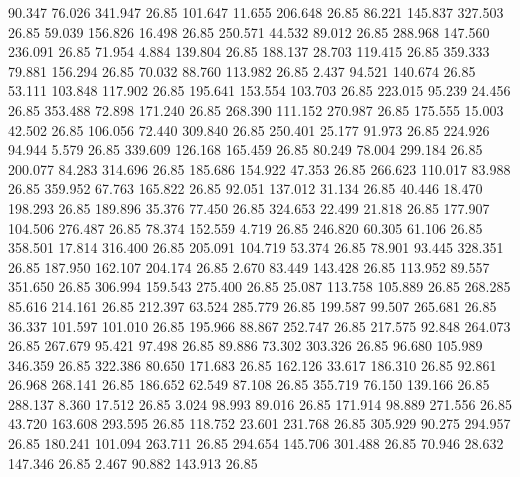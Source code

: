   90.347   76.026  341.947        26.85
 101.647   11.655  206.648        26.85
  86.221  145.837  327.503        26.85
  59.039  156.826   16.498        26.85
 250.571   44.532   89.012        26.85
 288.968  147.560  236.091        26.85
  71.954    4.884  139.804        26.85
 188.137   28.703  119.415        26.85
 359.333   79.881  156.294        26.85
  70.032   88.760  113.982        26.85
   2.437   94.521  140.674        26.85
  53.111  103.848  117.902        26.85
 195.641  153.554  103.703        26.85
 223.015   95.239   24.456        26.85
 353.488   72.898  171.240        26.85
 268.390  111.152  270.987        26.85
 175.555   15.003   42.502        26.85
 106.056   72.440  309.840        26.85
 250.401   25.177   91.973        26.85
 224.926   94.944    5.579        26.85
 339.609  126.168  165.459        26.85
  80.249   78.004  299.184        26.85
 200.077   84.283  314.696        26.85
 185.686  154.922   47.353        26.85
 266.623  110.017   83.988        26.85
 359.952   67.763  165.822        26.85
  92.051  137.012   31.134        26.85
  40.446   18.470  198.293        26.85
 189.896   35.376   77.450        26.85
 324.653   22.499   21.818        26.85
 177.907  104.506  276.487        26.85
  78.374  152.559    4.719        26.85
 246.820   60.305   61.106        26.85
 358.501   17.814  316.400        26.85
 205.091  104.719   53.374        26.85
  78.901   93.445  328.351        26.85
 187.950  162.107  204.174        26.85
   2.670   83.449  143.428        26.85
 113.952   89.557  351.650        26.85
 306.994  159.543  275.400        26.85
  25.087  113.758  105.889        26.85
 268.285   85.616  214.161        26.85
 212.397   63.524  285.779        26.85
 199.587   99.507  265.681        26.85
  36.337  101.597  101.010        26.85
 195.966   88.867  252.747        26.85
 217.575   92.848  264.073        26.85
 267.679   95.421   97.498        26.85
  89.886   73.302  303.326        26.85
  96.680  105.989  346.359        26.85
 322.386   80.650  171.683        26.85
 162.126   33.617  186.310        26.85
  92.861   26.968  268.141        26.85
 186.652   62.549   87.108        26.85
 355.719   76.150  139.166        26.85
 288.137    8.360   17.512        26.85
   3.024   98.993   89.016        26.85
 171.914   98.889  271.556        26.85
  43.720  163.608  293.595        26.85
 118.752   23.601  231.768        26.85
 305.929   90.275  294.957        26.85
 180.241  101.094  263.711        26.85
 294.654  145.706  301.488        26.85
  70.946   28.632  147.346        26.85
   2.467   90.882  143.913        26.85
